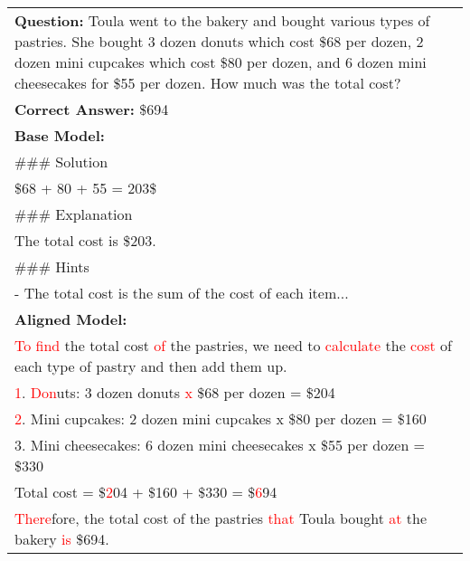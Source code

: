 \begin{table*}[t]


\begin{center}
\begin{small}
\begin{tabular}{|p{13.5cm}|}
\toprule
\textbf{Question:} Toula went to the bakery and bought various types of pastries. She bought 3 dozen donuts which cost \$68 per dozen, 2 dozen mini cupcakes which cost \$80 per dozen, and 6 dozen mini cheesecakes for \$55 per dozen. How much was the total cost? \\
\textbf{Correct Answer:} \$694 \\
\midrule
\textbf{Base Model:} \\
\#\#\# Solution \\
\$68 + 80 + 55 = 203\$\\
\#\#\# Explanation\\
The total cost is \$203.\\
\#\#\# Hints\\
- The total cost is the sum of the cost of each item...\\

\midrule
\textbf{Aligned Model:} \\
\textcolor{red}{To find} the total cost \textcolor{red}{of} the pastries, we need to \textcolor{red}{calculate} the \textcolor{red}{cost} of each type of pastry and then add them up.\\
\textcolor{red}{1}. \textcolor{red}{Don}uts: 3 dozen donuts \textcolor{red}{x} \$68 per dozen = \$204\\
\textcolor{red}{2}. Mini cupcakes: 2 dozen mini cupcakes x \$80 per dozen = \$160\\
3. Mini cheesecakes: 6 dozen mini cheesecakes x \$55 per dozen = \$330\\
Total cost = \$\textcolor{red}{2}04 + \$160 + \$330 = \$\textcolor{red}{6}94\\
\textcolor{red}{There}fore, the total cost of the pastries \textcolor{red}{that} Toula bought \textcolor{red}{at} the bakery \textcolor{red}{is} \$694.\\


\end{tabular}
\end{small}
\end{center}
\end{table*}
